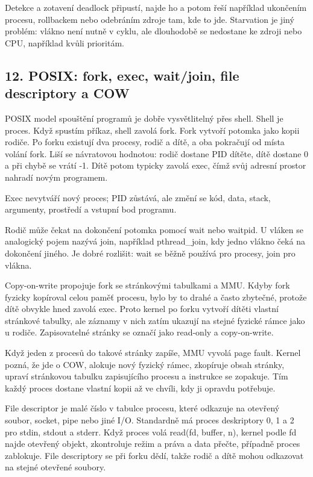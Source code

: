 Detekce a zotavení deadlock připustí, najde ho a potom řeší například ukončením procesu, rollbackem nebo odebráním zdroje tam, kde to jde. Starvation je jiný problém: vlákno není nutně v cyklu, ale dlouhodobě se nedostane ke zdroji nebo CPU, například kvůli prioritám.

\subsection*{12. POSIX: fork, exec, wait/join, file descriptory a COW}

POSIX model spouštění programů je dobře vysvětlitelný přes shell. Shell je proces. Když spustím příkaz, shell zavolá fork. Fork vytvoří potomka jako kopii rodiče. Po forku existují dva procesy, rodič a dítě, a oba pokračují od místa volání fork. Liší se návratovou hodnotou: rodič dostane PID dítěte, dítě dostane 0 a při chybě se vrátí -1. Dítě potom typicky zavolá exec, čímž svůj adresní prostor nahradí novým programem.

Exec nevytváří nový proces; PID zůstává, ale změní se kód, data, stack, argumenty, prostředí a vstupní bod programu.

Rodič může čekat na dokončení potomka pomocí wait nebo waitpid. U vláken se analogický pojem nazývá join, například pthread\_join, kdy jedno vlákno čeká na dokončení jiného. Je dobré rozlišit: wait se běžně používá pro procesy, join pro vlákna.

Copy-on-write propojuje fork se stránkovými tabulkami a MMU. Kdyby fork fyzicky kopíroval celou paměť procesu, bylo by to drahé a často zbytečné, protože dítě obvykle hned zavolá exec. Proto kernel po forku vytvoří dítěti vlastní stránkové tabulky, ale záznamy v nich zatím ukazují na stejné fyzické rámce jako u rodiče. Zapisovatelné stránky se označí jako read-only a copy-on-write.

Když jeden z procesů do takové stránky zapíše, MMU vyvolá page fault. Kernel pozná, že jde o COW, alokuje nový fyzický rámec, zkopíruje obsah stránky, upraví stránkovou tabulku zapisujícího procesu a instrukce se zopakuje. Tím každý proces dostane vlastní kopii až ve chvíli, kdy ji opravdu potřebuje.

File descriptor je malé číslo v tabulce procesu, které odkazuje na otevřený soubor, socket, pipe nebo jiné I/O. Standardně má proces deskriptory 0, 1 a 2 pro stdin, stdout a stderr. Když proces volá read(fd, buffer, n), kernel podle fd najde otevřený objekt, zkontroluje režim a práva a data přečte, případně proces zablokuje. File descriptory se při forku dědí, takže rodič a dítě mohou odkazovat na stejné otevřené soubory.

